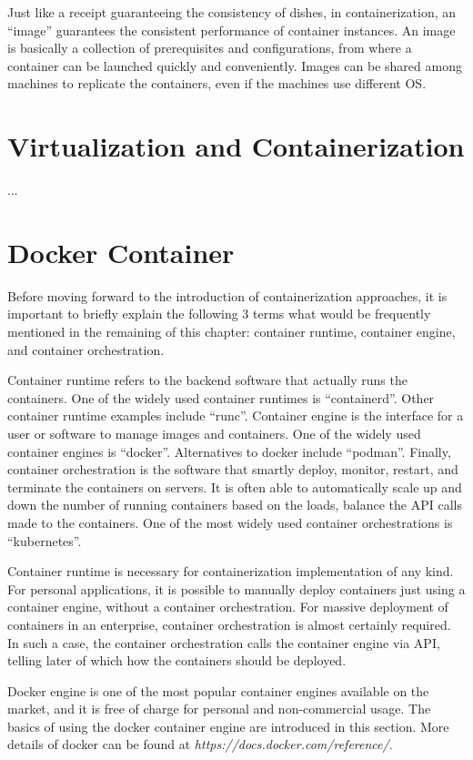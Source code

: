 Just like a receipt guaranteeing the consistency of dishes, in containerization, an ``image'' guarantees the consistent performance of container instances. An image is basically a collection of prerequisites and configurations, from where a container can be launched quickly and conveniently. Images can be shared among machines to replicate the containers, even if the machines use different OS.

\section{Virtualization and Containerization}
...

\section{Docker Container} \label{ch:vac:sec:dc}

Before moving forward to the introduction of containerization approaches, it is important to briefly explain the following 3 terms what would be frequently mentioned in the remaining of this chapter: container runtime, container engine, and container orchestration. 

Container runtime refers to the backend software that actually runs the containers. One of the widely used container runtimes is ``containerd''. Other container runtime examples include ``runc''. Container engine is the interface for a user or software to manage images and containers. One of the widely used container engines is ``docker''. Alternatives to docker include ``podman''. Finally, container orchestration is the software that smartly deploy, monitor, restart, and terminate the containers on servers. It is often able to automatically scale up and down the number of running containers based on the loads, balance the API calls made to the containers. One of the most widely used container orchestrations is ``kubernetes''.

Container runtime is necessary for containerization implementation of any kind. For personal applications, it is possible to manually deploy containers just using a container engine, without a container orchestration. For massive deployment of containers in an enterprise, container orchestration is almost certainly required. In such a case, the container orchestration calls the container engine via API, telling later of which how the containers should be deployed.

Docker engine is one of the most popular container engines available on the market, and it is free of charge for personal and non-commercial usage. The basics of using the docker container engine are introduced in this section. More details of docker can be found at \textit{https://docs.docker.com/reference/}.

